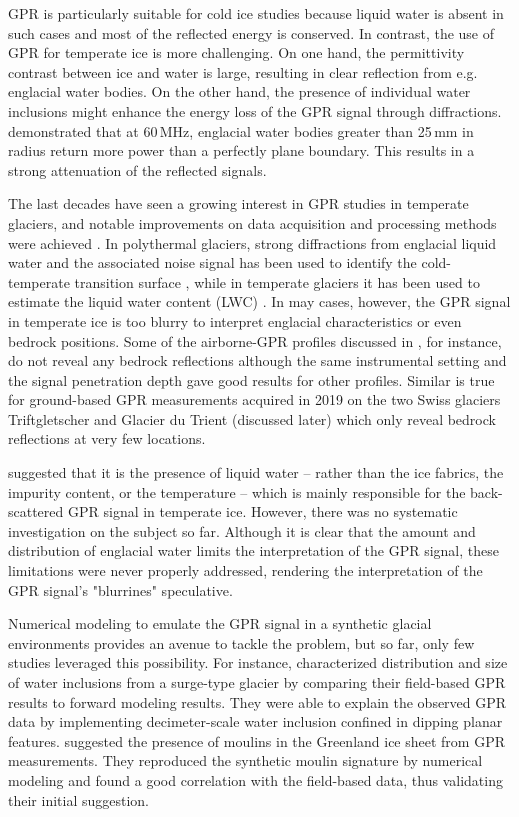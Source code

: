 GPR is particularly suitable for cold ice studies because liquid water is absent in such cases and most of the reflected energy is conserved. In contrast, the use of GPR for temperate ice is more challenging. On one hand, the permittivity contrast between ice and water is large, resulting in clear reflection from e.g. englacial water bodies. On the other hand, the presence of individual water inclusions might enhance the energy loss of the GPR signal through diffractions. \cite{Bamber1988} demonstrated that at 60\,MHz, englacial water bodies greater than 25\,mm in radius return more power than a perfectly plane boundary. This results in a strong attenuation of the reflected signals. 

The last decades have seen a growing interest in GPR studies in temperate glaciers, and notable improvements on data acquisition and processing methods were achieved \citep[e.g.][]{Schroeder&al2020}. In polythermal glaciers, strong diffractions from englacial liquid water and the associated noise signal has been used to identify the cold-temperate transition surface \citep[e.g.][]{Bjornsson&el1996}, while in temperate glaciers it has been used to estimate the liquid water content (LWC) \citep[e.g.][]{Murray&al2000}. In may cases, however, the GPR signal in temperate ice is too blurry to interpret englacial characteristics or even bedrock positions. Some of the airborne-GPR profiles discussed in \cite{Grab&al2021}, for instance, do not reveal any bedrock reflections although the same instrumental setting and the signal penetration depth gave good results for other profiles. Similar is true for ground-based GPR measurements acquired in 2019 on the two Swiss glaciers Triftgletscher and Glacier du Trient (discussed later) which only reveal bedrock reflections at very few locations. 

\cite{Smith&Evans1972} suggested that it is the presence of liquid water -- rather than the ice fabrics, the impurity content, or the temperature -- which is mainly responsible for the back-scattered GPR signal in temperate ice. However, there was no systematic investigation on the subject so far. Although it is clear that the amount and distribution of englacial water limits the interpretation of the GPR signal, these limitations were never properly addressed, rendering the interpretation of the GPR signal's "blurrines" speculative. 

Numerical modeling to emulate the GPR signal in a synthetic glacial environments provides an avenue to tackle the problem, but so far, only few studies leveraged this possibility. For instance, \cite{Barrett&al2008} characterized distribution and size of water inclusions from a surge-type glacier by comparing their field-based GPR results to forward modeling results. They were able to explain the observed GPR data by implementing decimeter-scale water inclusion confined in dipping planar features. \cite{Catania&al2008} suggested the presence of moulins in the Greenland ice sheet from GPR measurements. They reproduced the synthetic moulin signature by numerical modeling and found a good correlation with the field-based data, thus validating their initial suggestion. 

